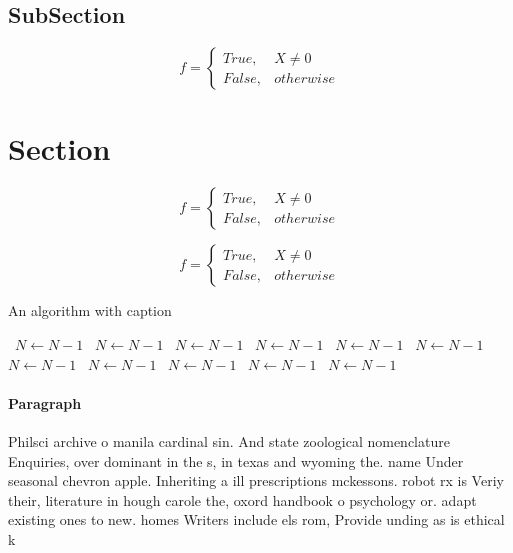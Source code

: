 \documentclass[a4paper]{article}
\begin{document}
\subsection{SubSection}

\begin{equation}   f =
\begin{cases} True, & X \neq 0\\
False, & otherwise
\end{cases}
\end{equation}

\section{Section}

\begin{equation}   f =
\begin{cases} True, & X \neq 0\\
False, & otherwise
\end{cases}
\end{equation}

\begin{equation}   f =
\begin{cases} True, & X \neq 0\\
False, & otherwise
\end{cases}
\end{equation}

\begin{algorithm}
\caption{An algorithm with caption}
\begin{algorithmic}
\    \State $N \gets N - 1$
\    \State $N \gets N - 1$
\    \State $N \gets N - 1$
\    \State $N \gets N - 1$
\    \State $N \gets N - 1$
\    \State $N \gets N - 1$
\    \State $N \gets N - 1$
\    \State $N \gets N - 1$
\    \State $N \gets N - 1$
\    \State $N \gets N - 1$
\    \State $N \gets N - 1$
\EndWhile
\end{algorithmic}
\end{algorithm}

\paragraph{Paragraph}
Philsci archive o manila cardinal sin. And state zoological nomenclature Enquiries, over dominant in the s, in texas and wyoming the. name Under seasonal chevron apple. Inheriting a ill prescriptions mckessons. robot rx is Veriy their, literature in hough carole the, oxord handbook o psychology or. adapt existing ones to new. homes Writers include els rom, Provide unding as is ethical k
\end{document}
